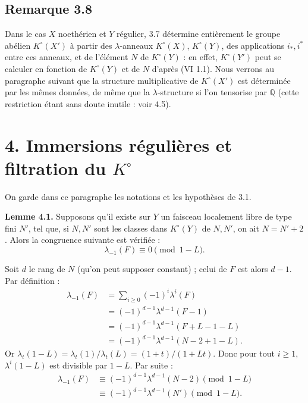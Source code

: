 \subsection*{Remarque 3.8}

Dans le cas \(X\) noethérien et \(Y\) régulier, 3.7 détermine entièrement le groupe abélien \(K^\circ(X')\) à partir des \(\lambda\)-anneaux \(K^\circ(X)\), \(K^\circ(Y)\), des applications \(i_*,i^*\) entre ces anneaux, et de l'élément \(N\) de \(K^\circ(Y)\) : en effet, \(K^\circ(Y')\) peut se calculer en fonction de \(K^\circ(Y)\) et de \(N\) d'après (VI 1.1). Nous verrons au paragraphe suivant que la structure multiplicative de \(K^\circ(X')\) est déterminée par les mêmes données, de même que la \(\lambda\)-structure si l'on tensorise par \(\mathbb Q\) (cette restriction étant sans doute inutile : voir 4.5).

\section*{4. Immersions régulières et filtration du \(K^\circ\)}

On garde dans ce paragraphe les notations et les hypothèses de 3.1.

\textbf{Lemme 4.1.} Supposons qu'il existe sur \(Y\) un faisceau localement libre de type fini \(N'\), tel que, si \(N,N'\) sont les classes dans \(K^\circ(Y)\) de \(N,N'\), on ait \(N=N'+2\). Alors la congruence suivante est vérifiée :
\[
  \lambda_{-1}(F)\equiv 0 \pmod{1-L}.
\]

Soit \(d\) le rang de \(N\) (qu'on peut supposer constant) ; celui de \(F\) est alors \(d-1\). Par définition :
\[
\begin{aligned}
\lambda_{-1}(F)
 &= \sum_{i\ge0}(-1)^i\lambda^i(F)\\
 &= (-1)^{d-1}\lambda^{d-1}(F-1)\\
 &= (-1)^{d-1}\lambda^{d-1}(F+L-1-L)\\
 &= (-1)^{d-1}\lambda^{d-1}(N-2+1-L).
\end{aligned}
\]
Or \(\lambda_t(1-L)=\lambda_t(1)/\lambda_t(L)=(1+t)/(1+Lt)\). Donc pour tout \(i\ge1\), \(\lambda^i(1-L)\) est divisible par \(1-L\). Par suite :
\[
\begin{aligned}
\lambda_{-1}(F)
  &\equiv (-1)^{d-1}\lambda^{d-1}(N-2) \pmod{1-L}\\
  &\equiv(-1)^{d-1}\lambda^{d-1}(N') \pmod{1-L}.
\end{aligned}
\]

